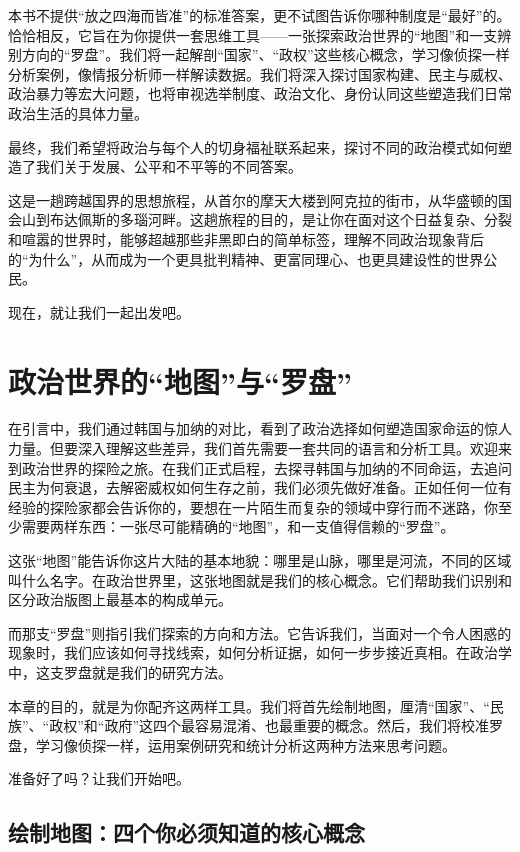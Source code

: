 \documentclass[a5paper, 11pt, openany]{ctexbook}
\begin{document}
本书不提供“放之四海而皆准”的标准答案，更不试图告诉你哪种制度是“最好”的。恰恰相反，它旨在为你提供一套思维工具——一张探索政治世界的“地图”和一支辨别方向的“罗盘”。我们将一起解剖“国家”、“政权”这些核心概念，学习像侦探一样分析案例，像情报分析师一样解读数据。我们将深入探讨国家构建、民主与威权、政治暴力等宏大问题，也将审视选举制度、政治文化、身份认同这些塑造我们日常政治生活的具体力量。

最终，我们希望将政治与每个人的切身福祉联系起来，探讨不同的政治模式如何塑造了我们关于发展、公平和不平等的不同答案。

这是一趟跨越国界的思想旅程，从首尔的摩天大楼到阿克拉的街市，从华盛顿的国会山到布达佩斯的多瑙河畔。这趟旅程的目的，是让你在面对这个日益复杂、分裂和喧嚣的世界时，能够超越那些非黑即白的简单标签，理解不同政治现象背后的“为什么”，从而成为一个更具批判精神、更富同理心、也更具建设性的世界公民。

现在，就让我们一起出发吧。

\chapter{政治世界的“地图”与“罗盘”}

在引言中，我们通过韩国与加纳的对比，看到了政治选择如何塑造国家命运的惊人力量。但要深入理解这些差异，我们首先需要一套共同的语言和分析工具。欢迎来到政治世界的探险之旅。在我们正式启程，去探寻韩国与加纳的不同命运，去追问民主为何衰退，去解密威权如何生存之前，我们必须先做好准备。正如任何一位有经验的探险家都会告诉你的，要想在一片陌生而复杂的领域中穿行而不迷路，你至少需要两样东西：一张尽可能精确的“地图”，和一支值得信赖的“罗盘”。

这张“地图”能告诉你这片大陆的基本地貌：哪里是山脉，哪里是河流，不同的区域叫什么名字。在政治世界里，这张地图就是我们的核心概念。它们帮助我们识别和区分政治版图上最基本的构成单元。

而那支“罗盘”则指引我们探索的方向和方法。它告诉我们，当面对一个令人困惑的现象时，我们应该如何寻找线索，如何分析证据，如何一步步接近真相。在政治学中，这支罗盘就是我们的研究方法。

本章的目的，就是为你配齐这两样工具。我们将首先绘制地图，厘清“国家”、“民族”、“政权”和“政府”这四个最容易混淆、也最重要的概念。然后，我们将校准罗盘，学习像侦探一样，运用案例研究和统计分析这两种方法来思考问题。

准备好了吗？让我们开始吧。

\section{绘制地图：四个你必须知道的核心概念}
\end{document}
